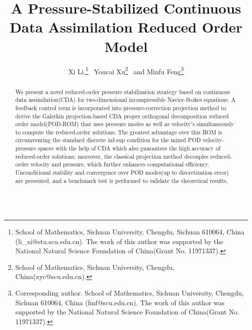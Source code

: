 \documentclass[10pt,twoside,openany,UTF8,CJK]{article}
\title{\bf  A Pressure-Stabilized Continuous Data Assimilation Reduced Order Model}
\author{
	Xi Li,\footnote{School of Mathematics, Sichuan University, Chengdu, Sichuan 610064, China (li\_xi@stu.scu.edu.cn). The work of this author was supported by the National Natural Science Foundation of China(Grant No. 11971337).}
	\ Youcai Xu\footnote{School of Mathematics, Sichuan University, Chengdu, China(xyc@scu.edu.cn).}
	\ and Minfu Feng\footnote{Corresponding author. School of Mathematics, Sichuan University, Chengdu, Sichuan 610064, China (fmf@scu.edu.cn). The work of this author was supported by the National Natural Science Foundation of China(Grant No. 11971337).}
}
\date{}
\begin{document}
	\maketitle
	\newcommand\blfootnote[1]{%
		\begingroup
		\renewcommand\thefootnote{}\footnote{#1}%
		\addtocounter{footnote}{-1}%
		\par\setlength\parindent{2em}
		\endgroup
	}
	
	\begin{abstract}
		We present a novel reduced-order pressure stabilization strategy based on continuous data assimilation(CDA) for two-dimensional incompressible Navier-Stokes equations. A feedback control term is incorporated into pressure-correction projection method to derive the Galerkin projection-based CDA proper orthogonal decomposition reduced order model(POD-ROM) that uses pressure modes as well as velocity’s simultaneously to compute the reduced-order solutions. The greatest advantage over this ROM is circumventing the standard discrete inf-sup condition for the mixed POD velocity-pressure spaces with the help of CDA which also guarantees the high accuracy of reduced-order solutions; moreover, the classical projection method decouples reduced-order velocity and pressure, which further enhances computational efficiency. Unconditional stability and convergence over POD modes(up to discretization error) are presented, and a benchmark test is performed to validate the theoretical results. \\
		
		\\
	\end{abstract}
	
	\baselineskip 15pt
	\parskip 10pt
	\setcounter{page}{1}
	
\end{document}
